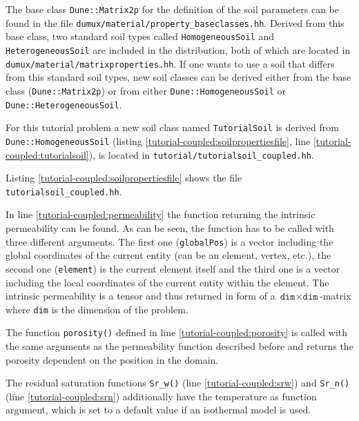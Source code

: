 The base class \texttt{Dune::Matrix2p} for the definition of the soil
parameters can be found in the file
\texttt{dumux/material/property\_baseclasses.hh}. Derived from this
base class, two standard soil types called \texttt{HomogeneousSoil}
and \texttt{HeterogeneousSoil} are included in the \Dumux
distribution, both of which are located in
\texttt{dumux/material/matrixproperties.hh}. If one wants to use a
soil that differs from this standard soil types, new soil classes can
be derived either from the base class (\texttt{Dune::Matrix2p}) or
from either \texttt{Dune::HomogeneousSoil} or
\texttt{Dune::HeterogeneousSoil}.

For this tutorial problem a new soil class named \texttt{TutorialSoil}
is derived from \texttt{Dune::HomogeneousSoil} (listing
\ref{tutorial-coupled:soilpropertiesfile}, line
\ref{tutorial-coupled:tutorialsoil}), is located in
\texttt{tutorial/tutorialsoil\_coupled.hh}.

Listing \ref{tutorial-coupled:soilpropertiesfile} shows the file
\texttt{tutorialsoil\_coupled.hh}.

\begin{lst}\label{tutorial-coupled:soilpropertiesfile} \mbox{}

\end{lst}

In line \ref{tutorial-coupled:permeability} the function returning the
intrinsic permeability can be found. As can be seen, the function has
to be called with three different arguments. The first one
(\texttt{globalPos}) is a vector including the global coordinates of the
current entity (can be an element, vertex, etc.), the second one
(\texttt{element}) is the current element itself and the third one is a vector
including the local coordinates of the current entity within the element. The intrinsic
permeability is a tensor and thus returned in form of a $\texttt{dim} \times
\texttt{dim}$-matrix where \texttt{dim} is the dimension of the problem.

The function \texttt{porosity()} defined in line
\ref{tutorial-coupled:porosity} is called with the same arguments as
the permeability function described before and returns the porosity
dependent on the position in the domain.

The residual saturation functions \texttt{Sr\_w()} (line
\ref{tutorial-coupled:srw}) and \texttt{Sr\_n()} (line
\ref{tutorial-coupled:srn}) additionally have the temperature as
function argument, which is set to a default value if an isothermal
model is used.

